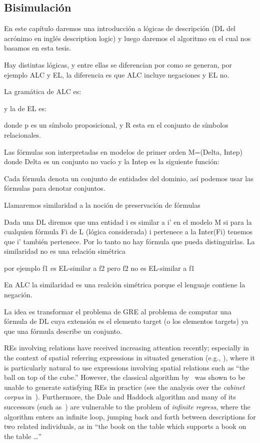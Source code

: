 \subsection{Bisimulaci\'on}

En este cap\'itulo daremos una introducci\'on a l\'ogicas de descripci\'on (DL del acr\'onimo en ingl\'es description logic) y luego daremos el algoritmo en el cual nos basamos en esta tesis.

Hay distintas l\'ogicas, y entre ellas se diferencian por como se generan, por ejemplo ALC y EL, la diferencia es que ALC incluye negaciones y EL no.

La gram\'atica de ALC es:


y la de EL es:


donde p es un s\'imbolo proposicional, y R esta en el conjunto de s\'imbolos relacionales.

Las f\'ormulas son interpretadas en modelos de primer orden M=(Delta, Intep) donde Delta es un conjunto no vac\'io y la Intep es la siguiente funci\'on:

Cada f\'ormula denota un conjunto de entidades del dominio, as\'i podemos usar las f\'ormulas para denotar conjuntos.

Llamaremos similaridad a la noci\'on de preservaci\'on de f\'ormulas

Dada una DL diremos que una entidad i es similar a i' en el modelo M si para la cualquien f\'ormula Fi de L (l\'ogica considerada) i pertenece a la Inter(Fi) tenemos que i' tambi\'en pertenece. Por lo tanto no hay f\'ormula que pueda distinguirlas. La similaridad no es una relaci\'on sim\'etrica

por ejemplo f1 es EL-similar a f2 pero f2 no es EL-similar a f1 

En ALC la similaridad es una realci\'on sim\'etrica porque el lenguaje contiene la negaci\'on.

La idea es transformar el problema de GRE al problema de computar una f\'ormula de DL cuya extensi\'on es el elemento target (o los elementos targets) ya que una f\'ormula describe un conjunto.



REs involving relations have received increasing attention recently;
especially in the context of spatial referring expressions in situated
generation (e.g., \cite{kelleher06:increm}),
where it is particularly natural to use expressions involving spatial
relations such as ``the ball on top of the cube.''  However, the
classical algorithm
by~\cite{dale91:gener} was shown to be
unable to generate satisfying REs in practice (see the analysis over
the \emph{cabinet corpus}
in~\cite{viethen06:algor}).  Furthermore, the
Dale and Haddock algorithm and many of its successors (such
as~\cite{kelleher06:increm}) are vulnerable to
the problem of \emph{infinite regress}, where the algorithm enters an
infinite loop, jumping back and forth between descriptions for two
related individuals, as in ``the book on the table which supports a
book on the table \ldots''

